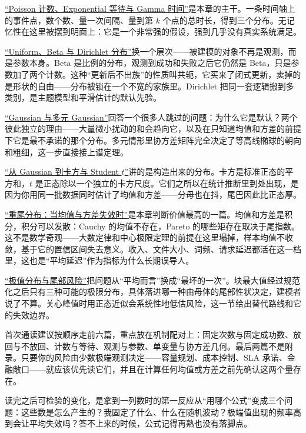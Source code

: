 \hyperref[sec:05-Probability/06-Common-Distributions/03]{``Poisson 计数、Exponential 等待与 Gamma 时间''}是本章的主干。一条时间轴上的事件点，数个数、量一次间隔、量到第 \(k\) 个点的总时长，得到三个分布。无记忆性在这里被摆到明面上：它是一个非常强的假设，强到几乎没有真实系统满足。

\hyperref[sec:05-Probability/06-Common-Distributions/04]{``Uniform、Beta 与 Dirichlet 分布''}换一个层次——被建模的对象不再是观测，而是参数本身。Beta 是比例的分布，观测到成功和失败之后它仍然是 Beta，只是参数加了两个计数。这种``更新后不出族''的性质叫共轭，它买来了闭式更新，卖掉的是形状的自由——分布被锁在一个不宽的家族里。Dirichlet 把同一套逻辑搬到多类别，是主题模型和平滑估计的默认先验。

\hyperref[sec:05-Probability/06-Common-Distributions/05]{``Gaussian 与多元 Gaussian''}回答一个很多人跳过的问题：为什么它是默认？两个彼此独立的理由——大量微小扰动的和会趋向它，以及在只知道均值和方差的前提下它是最不承诺的那个分布。多元情形里协方差矩阵完全决定了等高线椭球的朝向和粗细，这一步直接接上谱定理。

\hyperref[sec:05-Probability/06-Common-Distributions/06]{``从 Gaussian 到卡方与 Student \(t\)''}讲的是构造出来的分布。卡方是标准正态的平方和，\(t\) 是正态除以一个独立的卡方尺度。它们之所以在统计推断里到处出现，是因为你用同一批数据同时估计了均值和方差——分母也在抖，尾巴因此比正态厚。

\hyperref[sec:05-Probability/06-Common-Distributions/07]{``重尾分布：当均值与方差失效时''}是本章判断价值最高的一篇。均值和方差是积分，积分可以发散：Cauchy 的均值不存在，Pareto 的哪些矩存在取决于尾指数。这不是数学奇观——大数定律和中心极限定理的前提在这里塌掉，样本均值不收敛，基于它的置信区间失去意义。收入、文件大小、词频、请求延迟都活在这一档里，这也是``平均延迟''作为指标为什么长期误导人。

\hyperref[sec:05-Probability/06-Common-Distributions/08]{``极值分布与尾部风险''}把问题从``平均而言''换成``最坏的一次''。块最大值经过规范化之后只有三种可能的极限分布，具体落进哪一种由母体的尾部性状决定，建模者说了不算。关心峰值时用正态近似会系统性地低估风险，这一节给出替代路线和它的失效边界。

首次通读建议按顺序走前六篇，重点放在机制配对上：固定次数与固定成功数、放回与不放回、计数与等待、观测与参数、单变量与协方差几何。最后两篇不是附录。只要你的风险由少数极端观测决定——容量规划、成本控制、SLA 承诺、金融敞口——就应该优先读它们，并且在计算任何均值或方差之前先确认这两个量存在。

读完之后可检验的变化，是拿到一列数时的第一反应从``用哪个公式''变成三个问题：这些数是怎么产生的？我固定了什么、什么在随机波动？极端值出现的频率高到会让平均失效吗？答不上来的时候，公式记得再熟也没有落脚点。

